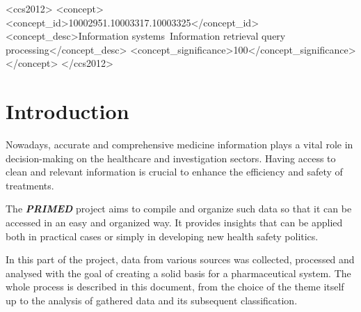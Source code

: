 \documentclass[sigconf]{acmart}
\begin{document}
\begin{CCSXML}
<ccs2012>
   <concept>
       <concept_id>10002951.10003317.10003325</concept_id>
       <concept_desc>Information systems~Information retrieval query processing</concept_desc>
       <concept_significance>100</concept_significance>
       </concept>
 </ccs2012>
\end{CCSXML}



\maketitle

\section{Introduction}

Nowadays, accurate and comprehensive medicine information plays a vital role in decision-making on the healthcare and investigation sectors. Having access to clean and relevant information is crucial to enhance the efficiency and safety of treatments.

The \textit{\textbf{PRIMED}} project aims to compile and organize such data so that it can be accessed in an easy and organized way. It provides insights that can be applied both in practical cases or simply in developing new health safety politics.

In this part of the project, data from various sources was collected, processed and analysed with the goal of creating a solid basis for a pharmaceutical system. The whole process is described in this document, from the choice of the theme itself up to the analysis of gathered data and its subsequent classification.
\end{document}
